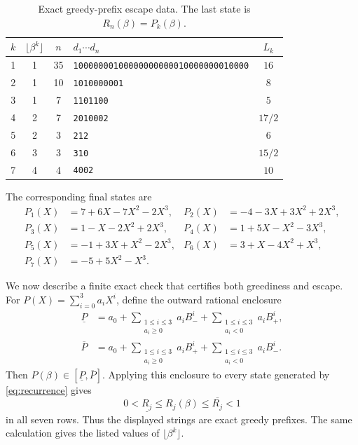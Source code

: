 \documentclass[11pt]{amsart}
\theoremstyle{definition}
\begin{document}
\begin{table}[t]
\centering
\caption{Exact greedy-prefix escape data.  The last state is
$R_n(\beta)=P_k(\beta)$.}\label{tab:witnesses}
\small
\setlength{\tabcolsep}{7pt}
\begin{tabular}{@{}ccclc@{}}
\toprule
$k$ & $\lfloor\beta^k\rfloor$ & $n$ & $d_1\cdots d_n$ & $L_k$\\
\midrule
1 & 1 & 35 & \texttt{10000000100000000000010000000010000} & $16$\\
2 & 1 & 10 & \texttt{1010000001} & $8$\\
3 & 1 & 7  & \texttt{1101100} & $5$\\
4 & 2 & 7  & \texttt{2010002} & $17/2$\\
5 & 2 & 3  & \texttt{212} & $6$\\
6 & 3 & 3  & \texttt{310} & $15/2$\\
7 & 4 & 4  & \texttt{4002} & $10$\\
\bottomrule
\end{tabular}
\end{table}

The corresponding final states are
\begin{align*}
P_1(X)&=7+6X-7X^2-2X^3,&
P_2(X)&=-4-3X+3X^2+2X^3,\\
P_3(X)&=1-X-2X^2+2X^3,&
P_4(X)&=1+5X-X^2-3X^3,\\
P_5(X)&=-1+3X+X^2-2X^3,&
P_6(X)&=3+X-4X^2+X^3,\\
P_7(X)&=-5+5X^2-X^3.&&
\end{align*}

We now describe a finite exact check that certifies both greediness and escape.
For $P(X)=\sum_{i=0}^3a_iX^i$, define the outward rational enclosure
\begin{align*}
\underline P&=a_0+
 \sum_{\substack{1\leq i\leq3\\a_i\geq0}}a_iB_-^i+
 \sum_{\substack{1\leq i\leq3\\a_i<0}}a_iB_+^i,\\
\overline P&=a_0+
 \sum_{\substack{1\leq i\leq3\\a_i\geq0}}a_iB_+^i+
 \sum_{\substack{1\leq i\leq3\\a_i<0}}a_iB_-^i.
\end{align*}
Then $P(\beta)\in[\underline P,\overline P]$.  Applying this enclosure to
every state generated by \eqref{eq:recurrence} gives
\begin{equation}\label{eq:statebounds}
0<\underline {R_j}\leq R_j(\beta)\leq\overline {R_j}<1
\end{equation}
in all seven rows.  Thus the displayed strings are exact greedy prefixes.
The same calculation gives the listed values of $\lfloor\beta^k\rfloor$.
\end{document}

